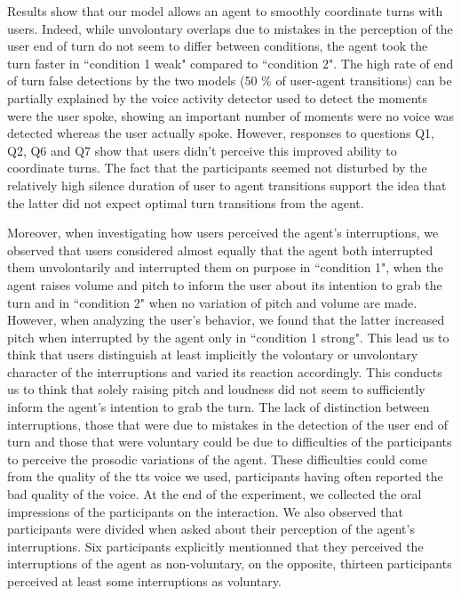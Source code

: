 Results show that our model allows an agent to smoothly coordinate turns with users. Indeed, while unvolontary overlaps due to mistakes in the perception of the user end of turn do not seem to differ between conditions, the agent took the turn faster in ``condition 1 weak" compared to ``condition 2". The high rate of end of turn false detections by the two models (50 \% of user-agent transitions) can be partially explained by the voice activity detector used to detect the moments were the user spoke, showing an important number of moments were no voice was detected whereas the user actually spoke. 
However, responses to questions Q1, Q2, Q6 and Q7 show that users didn't perceive this improved ability to coordinate turns. The fact that the participants seemed not disturbed by the relatively high silence duration of user to agent transitions support the idea that the latter did not expect optimal turn transitions from the agent.

Moreover, when investigating how users perceived the agent's interruptions, we observed that users considered almost equally that the agent both interrupted them unvolontarily and interrupted them on purpose in ``condition 1", when the agent raises volume and pitch to inform the user about its intention to grab the turn and in ``condition 2" when no variation of pitch and volume are made. However, when analyzing the user's behavior, we found that the latter increased pitch when interrupted by the agent only in ``condition 1 strong". This lead us to think that users distinguish at least implicitly the volontary or unvolontary character of the interruptions and varied its reaction accordingly. This conducts us to think that solely raising pitch and loudness did not seem to sufficiently inform the agent's intention to grab the turn. The lack of distinction between interruptions, those that were due to mistakes in the detection of the user end of turn and those that were voluntary could be due to difficulties of the participants to perceive the prosodic variations of the agent. These difficulties could come from the quality of the tts voice we used, participants having often reported the bad quality of the voice. 
At the end of the experiment, we collected the oral impressions of the participants on the interaction. We also observed that participants were divided when asked about their perception of the agent's interruptions. Six participants explicitly mentionned that they perceived the interruptions of the agent as non-voluntary, on the opposite, thirteen participants perceived at least some interruptions as voluntary. 

